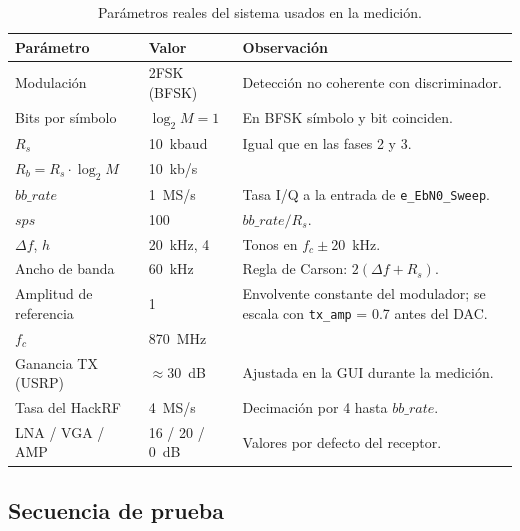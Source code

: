 \documentclass[conference]{IEEEtran}
\begin{document}
\begin{table}[!t]
\centering
\caption{Parámetros reales del sistema usados en la medición.}
\label{tab:param}
\begin{tabular}{>{\raggedright}p{2.6cm}>{\raggedright}p{1.6cm}p{3.4cm}}
\toprule
Parámetro & Valor & Observación \\
\midrule
Modulación & 2FSK (BFSK) & Detección no coherente con discriminador. \\
Bits por símbolo & $\log_2 M = 1$ & En BFSK símbolo y bit coinciden. \\
$R_s$ & 10~kbaud & Igual que en las fases 2 y 3. \\
$R_b = R_s \cdot \log_2 M$ & 10~kb/s & \\
$bb\_rate$ & 1~MS/s & Tasa I/Q a la entrada de \texttt{e\_EbN0\_Sweep}. \\
$sps$ & 100 & $bb\_rate/R_s$. \\
$\Delta f$, $h$ & 20~kHz, 4 & Tonos en $f_c \pm 20$~kHz. \\
Ancho de banda & 60~kHz & Regla de Carson: $2(\Delta f + R_s)$. \\
Amplitud de referencia & 1 & Envolvente constante del modulador; se escala con \texttt{tx\_amp} = 0.7 antes del DAC. \\
$f_c$ & 870~MHz & \\
Ganancia TX (USRP) & $\approx 30$~dB & Ajustada en la GUI durante la medición. \\
Tasa del HackRF & 4~MS/s & Decimación por 4 hasta $bb\_rate$. \\
LNA / VGA / AMP & 16 / 20 / 0~dB & Valores por defecto del receptor. \\
\bottomrule
\end{tabular}
\end{table}

\subsection{Secuencia de prueba}
\end{document}

